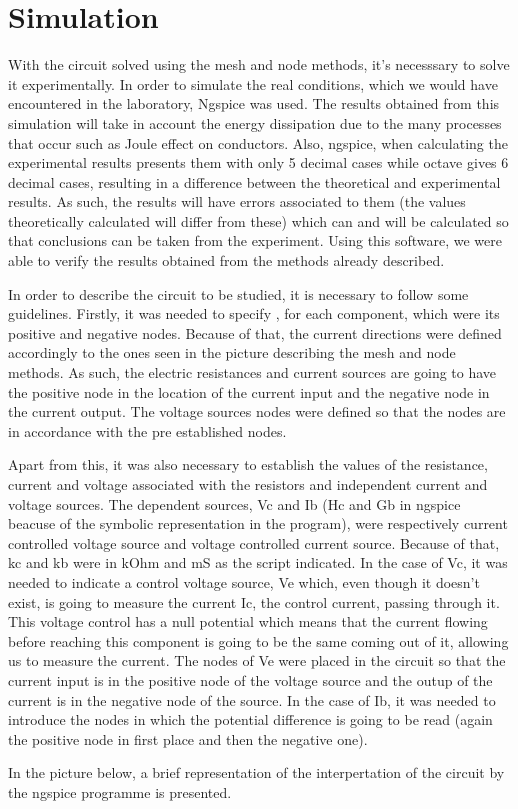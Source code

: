
\section{Simulation}
\label{sec:simulation}

\par \noindent  With the circuit solved using the mesh and node methods, it's necesssary to solve it experimentally. In order to simulate the real conditions, which we would have encountered in the laboratory, Ngspice was used. The results obtained from this simulation will take in account the energy dissipation due to the many processes that occur such as Joule effect on conductors. Also, ngspice, when calculating the experimental results presents them with only 5 decimal cases while octave gives 6 decimal cases, resulting in a difference between the theoretical and experimental results. As such, the results will have errors associated to them (the values theoretically calculated will differ from these) which can and will be calculated so that conclusions can be taken from the experiment. Using this software, we were able to verify the results obtained from the methods already described. 
\par \noindent  In order to describe the circuit to be studied, it is necessary to follow some guidelines. Firstly, it was needed to specify , for each component, which were its positive and negative nodes. Because of that, the current directions were defined accordingly to the ones seen in the picture describing the mesh and node methods. As such, the electric resistances and current sources are going to have the positive node in the location of the current input and the negative node in the current output. The voltage sources nodes were defined so that the nodes are in accordance with the pre established nodes.
\par \noindent Apart from this, it was also necessary to establish the values of the resistance, current and voltage associated with the resistors and independent current and voltage sources. The dependent sources, Vc and Ib (Hc and Gb in ngspice beacuse of the symbolic representation in the program), were respectively current controlled voltage source and voltage controlled current source. Because of that, kc and kb were in kOhm and mS as the script indicated. In the case of Vc, it was needed to indicate a control voltage source, Ve which, even though it doesn't exist, is going to measure the current Ic, the control current, passing through it. This voltage control has a null potential which means that the current flowing before reaching this component is going to be the same coming out of it, allowing us to measure the current. The nodes of Ve were placed in the circuit so that the current input is in the positive node of the voltage source and the outup of the current is in the negative node of the source.  In the case of Ib, it was needed to introduce the nodes in which the potential difference is going to be read (again the positive node in first place and then the negative one).
\par \noindent In the picture below, a brief representation of the interpertation of the circuit by the ngspice programme is presented.

